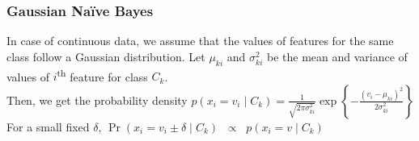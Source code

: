 \subsubsection{Gaussian Na\"ive Bayes}
In case of continuous data, we assume that the values of features for the same class follow a Gaussian distribution. Let $\mu_{ki}$ and $\sigma^2_{ki}$ be the mean and variance of values of $i$\textsuperscript{th} feature for class $C_k$.\\
Then, we get the probability density \enspace
$\boxed{
	p(x_{i} = v_i \mid C_{k}) = 
		\frac1{\sqrt{2\pi\sigma^2_{ki}}}
		\exp\left\{
			-\frac{(v_i - \mu_{ki})^2}{2\sigma^2_{ki}}
		\right\}
}$\\[2mm]
For a small fixed $\delta$, \enspace 
	$\Pr(x_{i} = v_i \pm \delta \mid C_{k}) \;\; \propto\;\;  p(x_{i} = v \mid C_{k})$